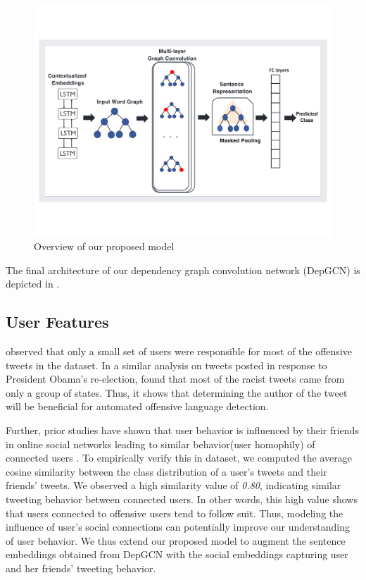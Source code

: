 \begin{figure}
    \centering
    \includegraphics[scale=0.6]{figures/architecture_key.pdf}
    \caption{Overview of our proposed model}
    \label{fig:arch}
\end{figure}
The final architecture of our dependency graph convolution network (DepGCN) is depicted in .
\subsection{User Features}
\citet{mishra2019abusive} observed that only a small set of users were responsible for most of the offensive tweets in the \citet{waseem-hovy-2016} dataset. In a similar analysis on tweets posted in response to President Obama's re-election, \citet{racist_article} found that most of the racist tweets came from only a group of states. Thus, it shows that determining the author of the tweet will be beneficial for automated offensive language detection.

Further, prior studies have shown that user behavior is influenced by their friends in online social networks leading to similar behavior(user homophily) of connected users \cite{homophily, social_influence}.
To empirically verify this in \citet{waseem-hovy-2016} dataset, we computed the average cosine similarity between the class distribution of a user's tweets and their friends' tweets. We observed a high similarity value of \emph{0.80}, indicating similar tweeting behavior between connected users. In other words, this high value shows that users connected to offensive users tend to follow suit. Thus, modeling the influence of user's social connections can potentially improve our understanding of user behavior.
We thus extend our proposed model to augment the sentence embeddings obtained from DepGCN with the social embeddings capturing user and her friends' tweeting behavior.

